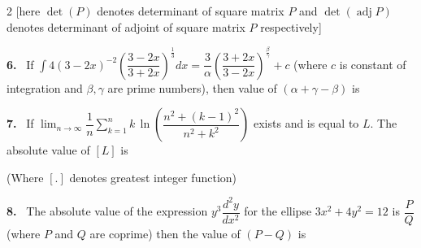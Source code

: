 \documentclass[10pt]{extarticle}
\newcommand{\qn}[1]{\par\smallskip\noindent\textbf{#1.}~}
\begin{document}
\begin{multicols}{2}
[here $\det(P)$ denotes determinant of square matrix $P$ and $\det(\operatorname{adj}P)$ denotes determinant of adjoint of square matrix $P$ respectively]
\qn{6} If $\displaystyle\int4(3-2x)^{-2}\left(\dfrac{3-2x}{3+2x}\right)^{\frac13}dx=\dfrac3\alpha\left(\dfrac{3+2x}{3-2x}\right)^{\frac\beta\gamma}+c$ (where $c$ is constant of integration and $\beta,\gamma$ are prime numbers), then value of $(\alpha+\gamma-\beta)$ is
\qn{7} If $\displaystyle\lim_{n\to\infty}\dfrac1n\sum_{k=1}^{n}k\,\ln\!\left(\dfrac{n^2+(k-1)^2}{n^2+k^2}\right)$ exists and is equal to $L$. The absolute value of $[L]$ is

(Where $[.]$ denotes greatest integer function)
\qn{8} The absolute value of the expression $y^3\dfrac{d^2y}{dx^2}$ for the ellipse $3x^2+4y^2=12$ is $\dfrac PQ$ (where $P$ and $Q$ are coprime) then the value of $(P-Q)$ is
\end{multicols}
\end{document}

